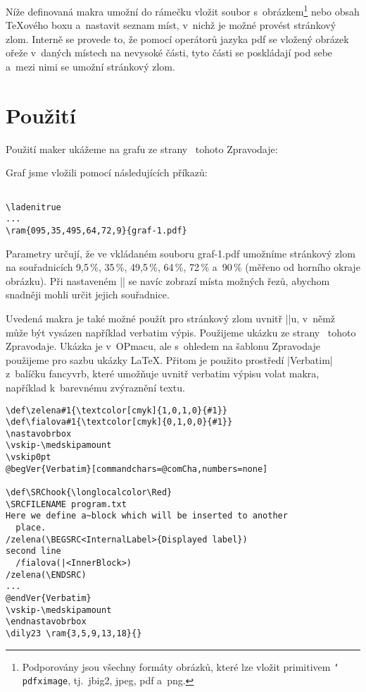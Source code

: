 \documentclass{csbulletin}
\def\p#1{\texttt{\char`\\#1}}
\def\soub#1{{\sf#1}}
\begin{document}
Níže definovaná makra umožní do rámečku vložit soubor s~obrázkem\footnote{Podporovány jsou všechny formáty obrázků, které lze vložit primitivem \p{pdfximage}, tj.~\soub{jbig2}, \soub{jpeg}, \soub{pdf} a~\soub{png}.} nebo obsah \TeX ového boxu a~nastavit seznam míst, v~nichž je možné provést stránkový zlom. Interně se provede to, že pomocí operátorů jazyka pdf se vložený obrázek ořeže v~daných místech na nevysoké části, tyto části se poskládají pod sebe a~mezi nimi se umožní stránkový zlom.

\JSvvvskip

\section{Použití}

Použití maker ukážeme na grafu ze strany~\pageref{literate-s15} tohoto Zpravodaje:

\ladenitrue
{}

\noindent
Graf jsme vložili pomocí následujících příkazů:
\begin{Verbatim}[numbers=none]

\ladenitrue
...
\ram{095,35,495,64,72,9}{graf-1.pdf}
\end{Verbatim}
\noindent
Parametry určují, že ve vkládaném souboru \soub{graf-1.pdf} umožníme stránkový zlom na souřadnicích 9,5\,\%, 35\,\%, 49,5\,\%, 64\,\%, 72\,\% a~90\,\% (měřeno od horního okraje obrázku). Při nastaveném |\ladenitrue| se navíc zobrazí místa možných řezů, abychom snadněji mohli určit jejich souřadnice.

\def\nastavobrbox{\setbox\obrbox\vbox\bgroup
  \hsize\dimexpr\hsize-2\hodstup\relax}
\def\endnastavobrbox{\egroup}

Uvedená makra je také možné použít pro stránkový zlom uvnitř |\vbox|u, v~němž může být vysázen například verbatim výpis. Použijeme ukázku ze strany~\pageref{literate-pripravaukazka} tohoto Zpravodaje. Ukázka je v~OPmacu, ale s~ohledem na šablonu Zpravodaje použijeme pro sazbu ukázky \LaTeX. Přitom je použito prostředí |Verbatim| z~balíčku \soub{fancyvrb}, které umožňuje uvnitř verbatim výpisu volat makra, například k~barevnému zvýraznění textu.

\def\begVer{\char`\\begin}
\def\comCha{/()}
\def\endVer{\char`\\end}
\begin{Verbatim}[commandchars=@QW,numbers=none]
\def\zelena#1{\textcolor[cmyk]{1,0,1,0}{#1}}
\def\fialova#1{\textcolor[cmyk]{0,1,0,0}{#1}}
\nastavobrbox
\vskip-\medskipamount
\vskip0pt
@begVer{Verbatim}[commandchars=@comCha,numbers=none]

\def\SRChook{\longlocalcolor\Red}
\SRCFILENAME program.txt
Here we define a~block which will be inserted to another
  place.
/zelena(\BEGSRC<InternalLabel>{Displayed label})
second line
  /fialova(|<InnerBlock>)
/zelena(\ENDSRC)
...
@endVer{Verbatim}
\vskip-\medskipamount
\endnastavobrbox
\dily23 \ram{3,5,9,13,18}{}
\end{Verbatim}
\end{document}
